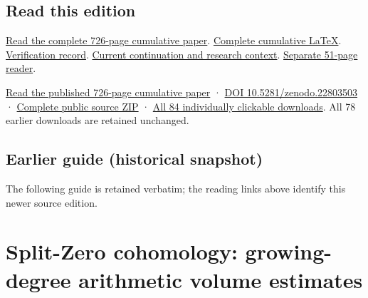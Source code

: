 \documentclass[
]{article}
\begin{document}
\subsection{Read this edition}\label{read-this-edition-3}

\href{https://github.com/KokunoYumeto/zeta-function-research-reader/blob/main/workbenches/splitzero-tandem/continuations/20260917-moving-cutoff-growing-ratio/15_CURRENT_MIXED_CONTROL_READER.pdf}{Read
the complete 726-page cumulative paper}.
\href{https://github.com/KokunoYumeto/zeta-function-research-reader/blob/main/workbenches/splitzero-tandem/continuations/20260917-moving-cutoff-growing-ratio/14_CURRENT_KERNEL_AND_MULTIPLICITY_PROOFS.tex}{Complete
cumulative LaTeX}.
\href{https://github.com/KokunoYumeto/zeta-function-research-reader/blob/main/workbenches/splitzero-tandem/continuations/20260917-moving-cutoff-growing-ratio/12_VALIDATION.md}{Verification
record}.
\href{https://github.com/KokunoYumeto/zeta-function-research-reader/blob/main/workbenches/splitzero-tandem/continuations/20260917-moving-cutoff-growing-ratio/00_CONTINUE_HERE.md}{Current
continuation and research context}.
\href{https://github.com/KokunoYumeto/zeta-function-research-reader/blob/main/workbenches/splitzero-tandem/continuations/20260917-moving-cutoff-growing-ratio/GROWING_RATIO_PROOF_SUPPLEMENT.pdf}{Separate
51-page reader}.

\href{https://zenodo.org/api/records/22803503/files/82-splitzero-moving-cutoff-reader.pdf/content}{Read
the published 726-page cumulative paper} ·
\href{https://doi.org/10.5281/zenodo.22803503}{DOI
10.5281/zenodo.22803503} ·
\href{https://zenodo.org/api/records/22803503/files/83-splitzero-moving-cutoff-sources.zip/content}{Complete
public source ZIP} ·
\href{https://github.com/KokunoYumeto/zeta-function-research-reader/blob/main/calculation_edition_20260917_moving_cutoff_growing_ratio/README.md}{All
84 individually clickable downloads}. All 78 earlier downloads are
retained unchanged.

\subsection{Earlier guide (historical
snapshot)}\label{earlier-guide-historical-snapshot-7}

The following guide is retained verbatim; the reading links above
identify this newer source edition.

\section{Split-Zero cohomology: growing-degree arithmetic volume
estimates}\label{split-zero-cohomology-growing-degree-arithmetic-volume-estimates}
\end{document}
